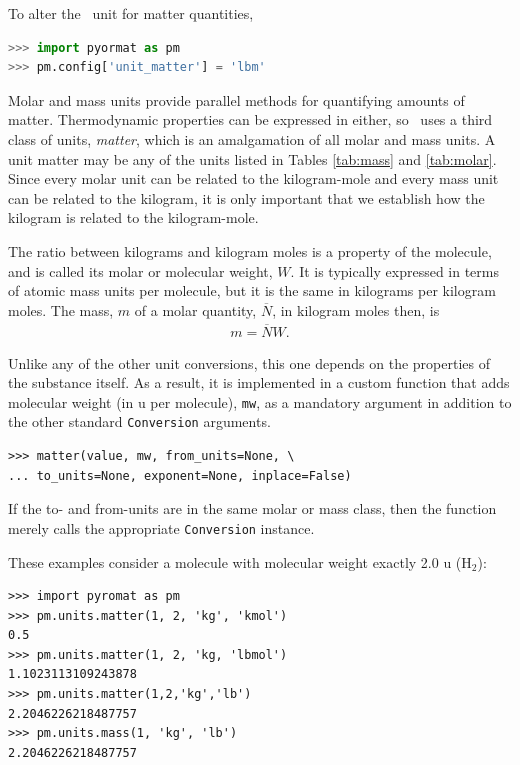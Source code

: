To alter the \PM\ unit for matter quantities,
\begin{lstlisting}[language=Python]
>>> import pyormat as pm
>>> pm.config['unit_matter'] = 'lbm'
\end{lstlisting}

Molar and mass units provide parallel methods for quantifying amounts of matter.  Thermodynamic properties can be expressed in either, so \PM\ uses a third class of units, \emph{matter}, which is an amalgamation of all molar and mass units.  A unit matter may be any of the units listed in Tables \ref{tab:mass} and \ref{tab:molar}.  Since every molar unit can be related to the kilogram-mole and every mass unit can be related to the kilogram, it is only important that we establish how the kilogram is related to the kilogram-mole.

The ratio between kilograms and kilogram moles is a property of the molecule, and is called its molar or molecular weight, $W$.  It is typically expressed in terms of atomic mass units per molecule, but it is the same in kilograms per kilogram moles.  The mass, $m$ of a molar quantity, $\overline{N}$, in kilogram moles then, is
\begin{align}
m = \overline{N} W.
\end{align}

Unlike any of the other unit conversions, this one depends on the properties of the substance itself.  As a result, it is implemented in a custom function that adds molecular weight (in u per molecule), \verb|mw|, as a mandatory argument in addition to the other standard \verb|Conversion| arguments.

\begin{lstlisting}
>>> matter(value, mw, from_units=None, \
... to_units=None, exponent=None, inplace=False)
\end{lstlisting}

If the to- and from-units are in the same molar or mass class, then the function merely calls the appropriate \verb|Conversion| instance.

These examples consider a molecule with molecular weight exactly 2.0 u (H$_2$):
\begin{lstlisting}
>>> import pyromat as pm
>>> pm.units.matter(1, 2, 'kg', 'kmol')
0.5
>>> pm.units.matter(1, 2, 'kg, 'lbmol')
1.1023113109243878
>>> pm.units.matter(1,2,'kg','lb')
2.2046226218487757
>>> pm.units.mass(1, 'kg', 'lb')
2.2046226218487757
\end{lstlisting}

%
%

